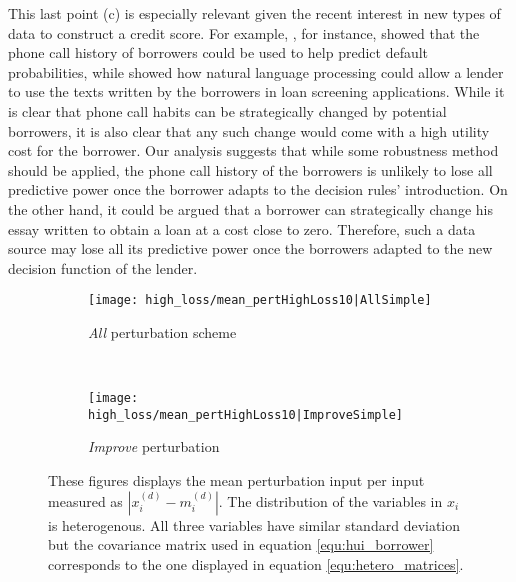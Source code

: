 \documentclass[12pt]{article} %
\begin{document}
This last point (c) is especially relevant given the recent interest in new types of data to construct a credit score. For example,  \cite{oskarsdottir2019value}, for instance, showed that the phone call history of borrowers could be used to help predict default probabilities, while \cite{netzer2019words} showed how natural language processing could allow a lender to use the texts written by the borrowers in loan screening applications. While it is clear that phone call habits can be strategically changed by potential borrowers, it is also clear that any such change would come with a high utility cost for the borrower. Our analysis suggests that while some robustness method should be applied, the phone call history of the borrowers is unlikely to lose all predictive power once the borrower adapts to the decision rules' introduction. 
On the other hand, it could be argued that a borrower can strategically change his essay written to obtain a loan at a cost close to zero. Therefore, such a data source may lose all its predictive power once the borrowers adapted to the new decision function of the lender.  




\begin{figure*}[t!]
    \centering
    \begin{subfigure}{0.5\textwidth}
        \centering
        \texttt{[image: high\_loss/mean\_pertHighLoss10|AllSimple]}
        \caption{\textit{All} perturbation scheme}
        \label{fig:mean_pertAllSimpleHIGH_LOSS}
    \end{subfigure}%
    ~ 
    \begin{subfigure}{0.5\textwidth}
        \centering
        \texttt{[image: high\_loss/mean\_pertHighLoss10|ImproveSimple]}
            \caption{\textit{Improve} perturbation}
        \label{fig:mean_pertImproveSimpleHIGH_LOSS}
    \end{subfigure}
    \caption{These figures displays the mean perturbation input per input measured as $|x_i^{(d)}- m_i^{(d)}|$. The distribution of the variables in $x_i$ is heterogenous. All three variables have similar standard deviation but the covariance matrix used in equation \eqref{equ:hui_borrower} corresponds to the one displayed in equation \eqref{equ:hetero_matrices}.
}
\end{figure*}
\end{document}
